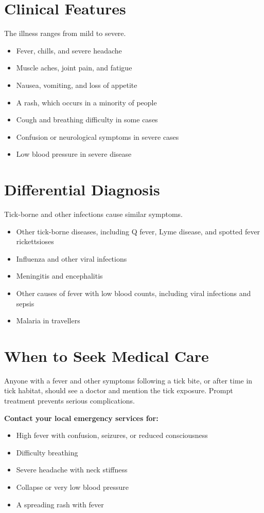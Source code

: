 \section*{Clinical Features}
The illness ranges from mild to severe.
\begin{itemize}
    \item Fever, chills, and severe headache
    \item Muscle aches, joint pain, and fatigue
    \item Nausea, vomiting, and loss of appetite
    \item A rash, which occurs in a minority of people
    \item Cough and breathing difficulty in some cases
    \item Confusion or neurological symptoms in severe cases
    \item Low blood pressure in severe disease
\end{itemize}

\section*{Differential Diagnosis}
Tick-borne and other infections cause similar symptoms.
\begin{itemize}
    \item Other tick-borne diseases, including Q fever, Lyme disease, and spotted fever rickettsioses
    \item Influenza and other viral infections
    \item Meningitis and encephalitis
    \item Other causes of fever with low blood counts, including viral infections and sepsis
    \item Malaria in travellers
\end{itemize}

\section*{When to Seek Medical Care}
Anyone with a fever and other symptoms following a tick bite, or after time in tick habitat, should see a doctor and mention the tick exposure. Prompt treatment prevents serious complications.

\textbf{Contact your local emergency services for:}
\begin{itemize}
    \item High fever with confusion, seizures, or reduced consciousness
    \item Difficulty breathing
    \item Severe headache with neck stiffness
    \item Collapse or very low blood pressure
    \item A spreading rash with fever
\end{itemize}

